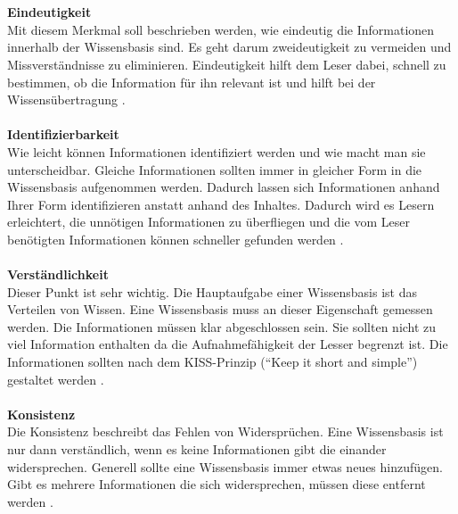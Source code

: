 \documentclass[a4paper,12pt]{scrartcl}
\begin{document}
\\\\
\textbf{Eindeutigkeit}\\
Mit diesem Merkmal soll beschrieben werden, wie eindeutig die Informationen innerhalb der Wissensbasis sind. Es geht darum zweideutigkeit zu vermeiden und Missverständnisse zu eliminieren. Eindeutigkeit hilft dem Leser dabei, schnell zu bestimmen, ob die Information für ihn relevant ist und hilft bei der Wissensübertragung \cite{Prause2013}.
\\\\
\textbf{Identifizierbarkeit}\\
Wie leicht können Informationen identifiziert werden und wie macht man sie unterscheidbar. Gleiche Informationen sollten immer in gleicher Form in die Wissensbasis aufgenommen werden. Dadurch lassen sich Informationen anhand Ihrer Form identifizieren anstatt anhand des Inhaltes. Dadurch wird es Lesern erleichtert, die unnötigen Informationen zu überfliegen und die vom Leser benötigten Informationen können schneller gefunden werden \cite{Prause2013}.
\\\\
\textbf{Verständlichkeit}\\
Dieser Punkt ist sehr wichtig. Die Hauptaufgabe einer Wissensbasis ist das Verteilen von Wissen. Eine Wissensbasis muss an dieser Eigenschaft gemessen werden. Die Informationen müssen klar abgeschlossen sein. Sie sollten nicht zu viel Information enthalten da die Aufnahmefähigkeit der Lesser begrenzt ist. Die Informationen sollten nach dem KISS-Prinzip (“Keep it short and simple”) gestaltet werden \cite{Prause2013}.
\\\\
\textbf{Konsistenz}\\
Die Konsistenz beschreibt das Fehlen von Widersprüchen. Eine Wissensbasis ist nur dann verständlich, wenn es keine Informationen gibt die einander widersprechen. Generell sollte eine Wissensbasis immer etwas neues hinzufügen. Gibt es mehrere Informationen die sich widersprechen, müssen diese entfernt werden \cite{Prause2013}.
\end{document}
